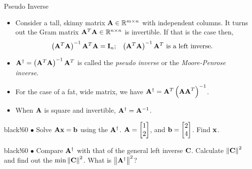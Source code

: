 \documentclass[aspectratio=169]{beamer}
\def\mf{\ensuremath\mathbf}
\def\mb{\ensuremath\mathbb}
\def\mc{\ensuremath\mathcal}
\def\lp{\ensuremath\left(}
\def\rp{\ensuremath\right)}
\def\lV{\ensuremath\left\lVert}
\def\rV{\ensuremath\right\rVert}
\def\lc{\ensuremath\left\{}
\def\rc{\ensuremath\right\}}
\newcommand{\demoex}[2]{\onslide<#1->\begin{color}{black!60} #2 \end{color}}
\newcommand{\anim}[3]{\onslide<#1->{\begin{color}{#2!60} #3 \end{color}}}
\begin{document}


\begin{frame}[t]{Pseudo Inverse}
\begin{itemize}
    \item Consider a tall, skinny  matrix $\mf{A} \in \mb{R}^{m \times n}$ with independent columns. It turns out the Gram matrix $\mf{A}^T\mf{A} \in \mb{R}^{n \times n}$ is invertible. If that is the case then,
    \[ \left(\mf{A}^T\mf{A}\right)^{-1}\mf{A}^T\mf{A} = \mf{I}_n; \,\,\,\,\, \left(\mf{A}^T\mf{A}\right)^{-1}\mf{A}^T \text{ is a left inverse.} \]
    \item $\mf{A}^{\dagger} = \left(\mf{A}^T\mf{A}\right)^{-1}\mf{A}^T$ is called the \textit{pseudo inverse} or the \textit{Moore-Penrose inverse}.

    \item For the case of a fat, wide matrix, we have $\mf{A}^{\dagger} = \mf{A}^T\left(\mf{AA}^T\right)^{-1}$.

    \item When $\mf{A}$ is square and invertible, $\mf{A}^{\dagger} = \mf{A}^{-1}$.
\end{itemize}
\vspace{0.2cm}

\demoex{2}{
    $\bullet$ Solve $\mf{Ax} = \mf{b}$ using the $\mf{A}^\dagger$. $\mf{A} = \begin{bmatrix*}[r]1\\2\end{bmatrix*}$, and $\mf{b} = \begin{bmatrix*}2\\4\end{bmatrix*}$. Find $\mf{x}$.
}\vspace{0.2cm}

\demoex{3}{
    $\bullet$ Compare $\mf{A}^\dagger$ with that of the general left inverse $\mf{C}$. Calculate $\lV \mf{C} \rV^2$ and find out the $\min \lV\mf{C}\rV^2$. What is $\lV\mf{A}^\dagger\rV^2$?
}\vspace{0.2cm}
\end{frame}
\end{document}
